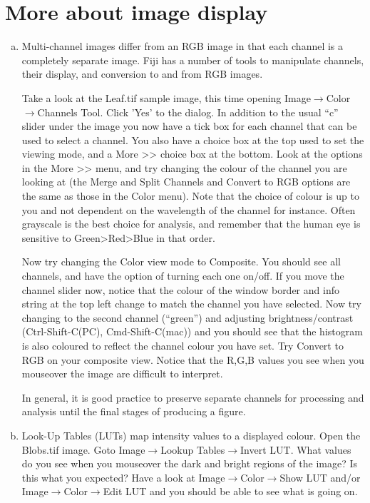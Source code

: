 \documentclass[a4paper,oneside,article]{memoir}
\begin{document}
  \chapter{More about image display}
    \begin{enumerate}[(a)]
      \item Multi-channel images differ from an RGB image in that each
      channel is a completely separate image. Fiji has a number of
      tools to manipulate channels, their display, and conversion to
      and from RGB images.

      Take a look at the Leaf.tif sample image, this time opening
      Image$\rightarrow$Color$\rightarrow$Channels Tool. Click 'Yes' to
      the dialog. In addition to the usual ``c'' slider under the image
      you now have a tick box for each channel that can be used to
      select a channel. You also have a choice box at the top used to
      set the viewing mode, and a More \textgreater{}\textgreater{}
      choice box at the bottom. Look at the options in the
      More \textgreater{}\textgreater{} menu, and try changing the
      colour of the channel you are looking at (the Merge and
      Split Channels and Convert to RGB options are the same as those
      in the Color menu). Note that the choice of colour is up to you
      and not dependent on the wavelength of the channel for instance.
      Often grayscale is the best choice for analysis, and remember
      that the human eye is sensitive to
      Green\textgreater{}Red\textgreater{}Blue in that order.

      Now try changing the Color view mode to Composite. You should see
      all channels, and have the option of turning each one on/off. If
      you move the channel slider now, notice that the colour of the
      window border and info string at the top left change to match the
      channel you have selected. Now try changing to the second channel
      (``green'') and adjusting brightness/contrast (Ctrl-Shift-C(PC),
      Cmd-Shift-C(mac)) and you should see that the histogram is also
      coloured to reflect the channel colour you have set. Try Convert
      to RGB on your composite view. Notice that the R,G,B values you
      see when you mouseover the image are difficult to interpret.

      In general, it is good practice to preserve separate channels for
      processing and analysis until the final stages of producing a figure.

      \item Look-Up Tables (LUTs) map intensity values to a displayed
      colour. Open the Blobs.tif image. Goto
      Image$\rightarrow$Lookup Tables$\rightarrow$Invert LUT. What values
      do you see when you mouseover the dark and bright regions of the
      image? Is this what you expected? Have a look at
      Image$\rightarrow$Color$\rightarrow$Show LUT and/or
      Image$\rightarrow$Color$\rightarrow$Edit LUT and you should be able
      to see what is going on.


\end{enumerate}
\end{document}
